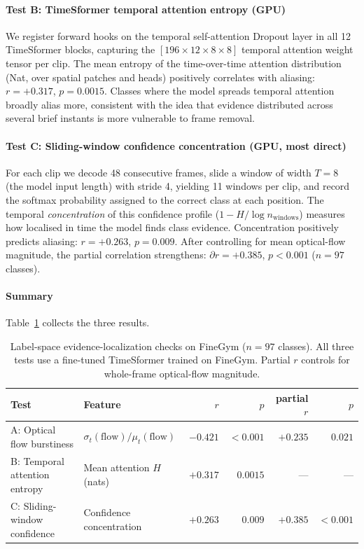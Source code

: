 \documentclass[a4paper, 10pt, conference, onecolumn]{ieeeconf}
\newcommand{\tabtight}{\setlength{\tabcolsep}{3.5pt}\renewcommand{\arraystretch}{1.12}}
\begin{document}
\paragraph{Test B: TimeSformer temporal attention entropy (GPU)} We register forward hooks on the temporal self-attention Dropout layer in all 12 TimeSformer blocks, capturing the $[196\times12\times8\times8]$ temporal attention weight tensor per clip. The mean entropy of the time-over-time attention distribution (Nat, over spatial patches and heads) positively correlates with aliasing: $r=+0.317$, $p=0.0015$. Classes where the model spreads temporal attention broadly alias more, consistent with the idea that evidence distributed across several brief instants is more vulnerable to frame removal.

\paragraph{Test C: Sliding-window confidence concentration (GPU, most direct)} For each clip we decode 48 consecutive frames, slide a window of width $T=8$ (the model input length) with stride 4, yielding 11 windows per clip, and record the softmax probability assigned to the correct class at each position. The temporal \emph{concentration} of this confidence profile ($1 - H/\log n_\mathrm{windows}$) measures how localised in time the model finds class evidence. Concentration positively predicts aliasing: $r=+0.263$, $p=0.009$. After controlling for mean optical-flow magnitude, the partial correlation strengthens: $\partial r = +0.385$, $p<0.001$ ($n=97$ classes).

\paragraph{Summary} Table~\ref{tab:label_space_nyquist} collects the three results.

\begin{table}[!htbp]
\centering
\caption{Label-space evidence-localization checks on FineGym ($n=97$ classes). All three tests use a fine-tuned TimeSformer trained on FineGym. Partial $r$ controls for whole-frame optical-flow magnitude.}
\label{tab:label_space_nyquist}
\scriptsize\tabtight
\begin{tabular}{l l r r r r}
\toprule
Test & Feature & $r$ & $p$ & partial $r$ & $p$ \\
\midrule
A: Optical flow burstiness & $\sigma_t(\text{flow}) / \mu_t(\text{flow})$ & $-0.421$ & ${<}0.001$ & $+0.235$ & $0.021$ \\
B: Temporal attention entropy & Mean attention $H$ (nats) & $+0.317$ & $0.0015$ & --- & --- \\
C: Sliding-window confidence & Confidence concentration & $+0.263$ & $0.009$ & $\mathbf{+0.385}$ & $\mathbf{<0.001}$ \\
\bottomrule
\end{tabular}
\end{table}
\end{document}
